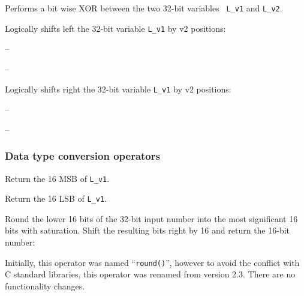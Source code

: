 Performs a bit wise XOR between the two 32-bit variables {\tt
L\_v1} and {\tt L\_v2}.


 

Logically shifts left the 32-bit variable {\tt L\_v1} by v2 positions:

 --  

 --  


 

Logically shifts right the 32-bit variable {\tt L\_v1} by v2
positions: 

 --  

 --  


\subsubsection{Data type conversion operators}


Return the 16 MSB of {\tt L\_v1}.


Return the 16 LSB of {\tt L\_v1}.


Round the lower 16 bits of the 32-bit input number into the most
significant 16 bits with saturation. Shift the resulting bits
right by 16 and return the 16-bit number:


Initially, this operator was named ``{\tt round()}'', however to avoid
the conflict with C standard libraries, this operator was renamed from
version 2.3. There are no functionality changes.

